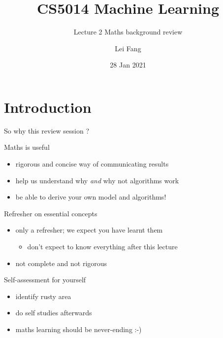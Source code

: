 \documentclass[ignorenonframetext,]{beamer}
\title{CS5014 Machine Learning}
\subtitle{Lecture 2 Maths background review}
\author{Lei Fang}
\date{28 Jan 2021}
\providecommand{\tightlist}{%
  \setlength{\itemsep}{0pt}\setlength{\parskip}{0pt}}
\begin{document}
\frame{\titlepage}

\hypertarget{introduction}{%
\section{Introduction}\label{introduction}}

\begin{frame}{So why this review session ?}
\protect\hypertarget{so-why-this-review-session}{}

Maths is useful

\begin{itemize}
\tightlist
\item
  rigorous and concise way of communicating results
\item
  help us understand why \emph{and} why not algorithms work
\item
  be able to derive your own model and algorithms!
\end{itemize}

\pause 
\bigskip

Refresher on essential concepts

\begin{itemize}
\tightlist
\item
  only a refresher; we expect you have learnt them

  \begin{itemize}
  \tightlist
  \item
    don't expect to know everything after this lecture
  \end{itemize}
\item
  not complete and not rigorous
\end{itemize}

\pause

\bigskip Self-assessment for yourself

\begin{itemize}
\tightlist
\item
  identify rusty area
\item
  do self studies afterwards
\item
  maths learning should be never-ending :-)
\end{itemize}

\end{frame}
\end{document}
